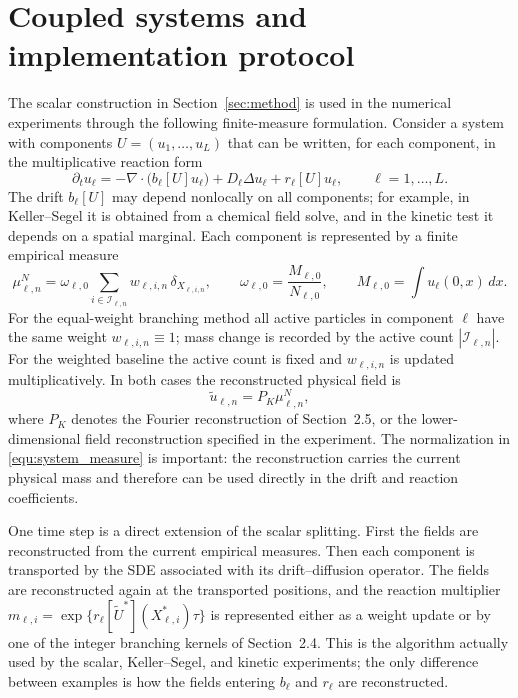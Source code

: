 \documentclass[a4paper,fleqn]{cas-sc}
\theoremstyle{definition}
\theoremstyle{remark}
\begin{document}
\section{Coupled systems and implementation protocol}
\label{sec:systems}
\label{sec:extension}

The scalar construction in Section~\ref{sec:method} is used in the numerical experiments through the following finite-measure formulation.  Consider a system with components $U=(u_1,\ldots,u_L)$ that can be written, for each component, in the multiplicative reaction form
\begin{equation}
\partial_t u_\ell
= -\nabla\!\cdot\bigl(b_\ell[U]u_\ell\bigr)
  + D_\ell \Delta u_\ell
  + r_\ell[U]u_\ell,
\qquad \ell=1,\ldots,L .
\label{equ:system_multiplicative}
\end{equation}
The drift $b_\ell[U]$ may depend nonlocally on all components; for example, in Keller--Segel it is obtained from a chemical field solve, and in the kinetic test it depends on a spatial marginal.  Each component is represented by a finite empirical measure
\begin{equation}
\mu_{\ell,n}^N
= \omega_{\ell,0}\sum_{i\in \mathcal I_{\ell,n}} w_{\ell,i,n}\,\delta_{X_{\ell,i,n}},
\qquad
\omega_{\ell,0}=\frac{M_{\ell,0}}{N_{\ell,0}},
\qquad
M_{\ell,0}=\int u_\ell(0,x)\,dx .
\label{equ:system_measure}
\end{equation}
For the equal-weight branching method all active particles in component $\ell$ have the same weight $w_{\ell,i,n}\equiv 1$; mass change is recorded by the active count $|\mathcal I_{\ell,n}|$.  For the weighted baseline the active count is fixed and $w_{\ell,i,n}$ is updated multiplicatively.  In both cases the reconstructed physical field is
\begin{equation}
\widetilde u_{\ell,n}=P_K\mu_{\ell,n}^N,
\label{equ:system_reconstruction}
\end{equation}
where $P_K$ denotes the Fourier reconstruction of Section~2.5, or the lower-dimensional field reconstruction specified in the experiment.  The normalization in \eqref{equ:system_measure} is important: the reconstruction carries the current physical mass and therefore can be used directly in the drift and reaction coefficients.

One time step is a direct extension of the scalar splitting.  First the fields are reconstructed from the current empirical measures.  Then each component is transported by the SDE associated with its drift--diffusion operator.  The fields are reconstructed again at the transported positions, and the reaction multiplier $m_{\ell,i}=\exp\{r_\ell[\widetilde U^*](X^*_{\ell,i})\tau\}$ is represented either as a weight update or by one of the integer branching kernels of Section~2.4.  This is the algorithm actually used by the scalar, Keller--Segel, and kinetic experiments; the only difference between examples is how the fields entering $b_\ell$ and $r_\ell$ are reconstructed.
\end{document}

